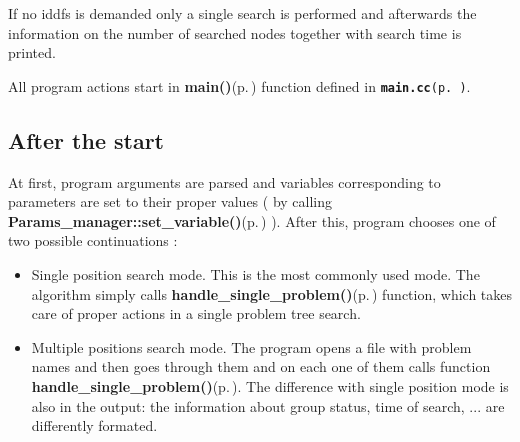 If no iddfs is demanded only a single search is performed and afterwards the information on the number of searched nodes together with search time is printed.

All program actions start in {\bf main()}{\rm (p.\,\pageref{main_8cc_a6})} function defined in {\tt {\bf main.cc}{\rm (p.\,\pageref{main_8cc})}}. \subsection{After the start}\label{page_2_page_2__sec_1}
At first, program arguments are parsed and variables corresponding to parameters are set to their proper values ( by calling {\bf Params\_\-manager::set\_\-variable()}{\rm (p.\,\pageref{classParams__manager_a23})} ). After this, program chooses one of two possible continuations :\begin{itemize}
\item Single position search mode. This is the most commonly used mode. The algorithm simply calls {\bf handle\_\-single\_\-problem()}{\rm (p.\,\pageref{main_8cc_a3})} function, which takes care of proper actions in a single problem tree search.\item Multiple positions search mode. The program opens a file with problem names and then goes through them and on each one of them calls function {\bf handle\_\-single\_\-problem()}{\rm (p.\,\pageref{main_8cc_a3})}. The difference with single position mode is also in the output: the information about group status, time of search, ... are differently formated.\end{itemize}
